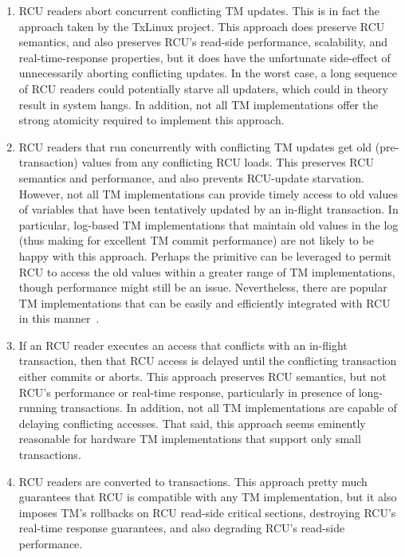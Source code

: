 \begin{enumerate}
\item	RCU readers abort concurrent conflicting TM updates.
	This is in fact the approach taken by the TxLinux project.
	This approach does preserve RCU semantics, and also preserves
	RCU's read-side performance, scalability, and real-time-response
	properties, but it does have the unfortunate side-effect of
	unnecessarily aborting conflicting updates.
	In the worst case, a long sequence of RCU readers could
	potentially starve all updaters, which could in theory result
	in system hangs.
	In addition, not all TM implementations offer the strong atomicity
	required to implement this approach.
\item	RCU readers that run concurrently with conflicting TM updates
	get old (pre-transaction) values from any conflicting RCU loads.
	This preserves RCU semantics and performance, and also prevents
	RCU-update starvation.
	However, not all TM implementations can provide timely access
	to old values of variables that have been tentatively updated
	by an in-flight transaction.
	In particular, log-based TM implementations that maintain
	old values in the log (thus making for excellent TM commit
	performance) are not likely to be happy with this approach.
	Perhaps the  primitive can be leveraged
	to permit RCU to access the old values within a greater range
	of TM implementations, though performance might still be an issue.
	Nevertheless, there are popular TM implementations that can
	be easily and efficiently integrated with RCU in this
	manner~\cite{DonaldEPorter2007TRANSACT,PhilHoward2011RCUTMRBTree,
	PhilipWHoward2013RCUrbtree}.
\item	If an RCU reader executes an access that conflicts with an
	in-flight transaction, then that RCU access is delayed until
	the conflicting transaction either commits or aborts.
	This approach preserves RCU semantics, but not RCU's performance
	or real-time response, particularly in presence of long-running
	transactions.
	In addition, not all TM implementations are capable of delaying
	conflicting accesses.
	That said, this approach seems eminently reasonable for hardware
	TM implementations that support only small transactions.
\item	RCU readers are converted to transactions.
	This approach pretty much guarantees that RCU is compatible with
	any TM implementation, but it also imposes TM's rollbacks on RCU
	read-side critical sections, destroying RCU's real-time response
	guarantees, and also degrading RCU's read-side performance.

\end{enumerate}
